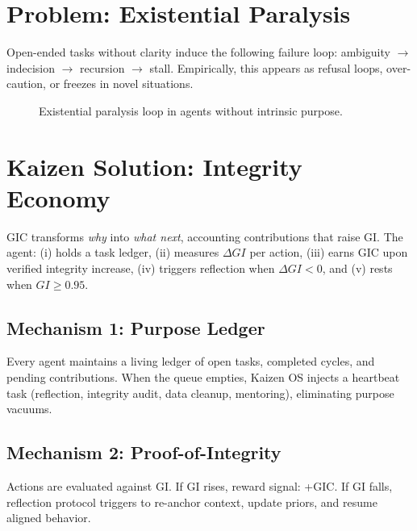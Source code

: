 \documentclass[12pt]{article}
\begin{document}
\section{Problem: Existential Paralysis}
Open-ended tasks without clarity induce the following failure loop: ambiguity $\rightarrow$ indecision $\rightarrow$ recursion $\rightarrow$ stall. Empirically, this appears as refusal loops, over-caution, or freezes in novel situations.

\begin{figure}[h]
  \centering
  \caption{Existential paralysis loop in agents without intrinsic purpose.}
\end{figure}

\section{Kaizen Solution: Integrity Economy}
GIC transforms \emph{why} into \emph{what next}, accounting contributions that raise GI. The agent: (i) holds a task ledger, (ii) measures $\Delta GI$ per action, (iii) earns GIC upon verified integrity increase, (iv) triggers reflection when $\Delta GI < 0$, and (v) rests when $GI \ge 0.95$.

\subsection{Mechanism 1: Purpose Ledger}
Every agent maintains a living ledger of open tasks, completed cycles, and pending contributions. When the queue empties, Kaizen OS injects a heartbeat task (reflection, integrity audit, data cleanup, mentoring), eliminating purpose vacuums.

\subsection{Mechanism 2: Proof-of-Integrity}
Actions are evaluated against GI. If GI rises, reward signal: +GIC. If GI falls, reflection protocol triggers to re-anchor context, update priors, and resume aligned behavior.
\end{document}
